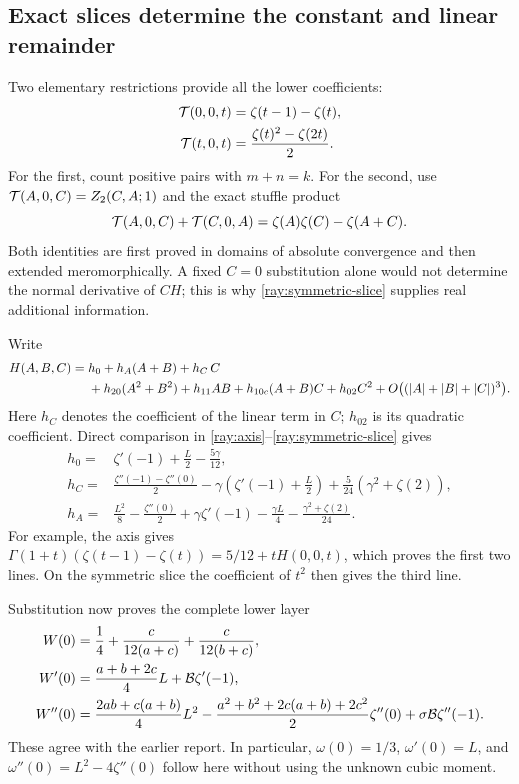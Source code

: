 \subsection{Exact slices determine the constant and linear remainder}

Two elementary restrictions provide all the lower coefficients:
\begin{align}
 \mathcal T(0,0,t)&=\zeta(t-1)-\zeta(t),\label{ray:axis}\\
 \mathcal T(t,0,t)&=\frac{\zeta(t)^2-\zeta(2t)}2.\label{ray:symmetric-slice}
\end{align}
For the first, count positive pairs with $m+n=k$. For the second,
use $\mathcal T(A,0,C)=Z_2(C,A;1)$ and the exact stuffle product
\begin{equation}\label{ray:stuffle-slice}
 \mathcal T(A,0,C)+\mathcal T(C,0,A)=\zeta(A)\zeta(C)-\zeta(A+C).
\end{equation}
Both identities are first proved in domains of absolute convergence
and then extended meromorphically. A fixed $C=0$ substitution alone
would not determine the normal derivative of $CH$; this is why
\eqref{ray:symmetric-slice} supplies real additional information.

Write
\begin{align}
 H(A,B,C)={}&h_0+h_A(A+B)+h_C\,C\notag\\
 &+h_{20}(A^2+B^2)+h_{11}AB+h_{10c}(A+B)C+h_{02}C^2
 +O\bigl((|A|+|B|+|C|)^3\bigr).
 \label{ray:H-Taylor}
\end{align}
Here $h_C$ denotes the coefficient of the linear term in $C$;
$h_{02}$ is its quadratic coefficient. Direct comparison in
\eqref{ray:axis}--\eqref{ray:symmetric-slice} gives
\begin{align}
 h_0={}&\zeta'(-1)+\frac L2-\frac{5\gamma}{12},\label{ray:h0}\\
 h_C={}&\frac{\zeta''(-1)-\zeta''(0)}2
       -\gamma\left(\zeta'(-1)+\frac L2\right)
       +\frac5{24}(\gamma^2+\zeta(2)),\label{ray:hC}\\
 h_A={}&\frac{L^2}{8}-\frac{\zeta''(0)}2+
       \gamma\zeta'(-1)-\frac{\gamma L}{4}
       -\frac{\gamma^2+\zeta(2)}{24}.
 \label{ray:hA}
\end{align}
For example, the axis gives
$\Gamma(1+t)(\zeta(t-1)-\zeta(t))=5/12+tH(0,0,t)$,
which proves the first two lines. On the symmetric slice the
coefficient of $t^2$ then gives the third line.

Substitution now proves the complete lower layer
\begin{align}
 W(0)&=\frac14+\frac{c}{12(a+c)}+\frac{c}{12(b+c)},\notag\\
 W'(0)&=\frac{a+b+2c}{4}L+\mathcal B\zeta'(-1),\notag\\
 W''(0)&=\frac{2ab+c(a+b)}4L^2
 -\frac{a^2+b^2+2c(a+b)+2c^2}{2}\zeta''(0)
 +\sigma\mathcal B\zeta''(-1).
 \label{ray:lower}
\end{align}
These agree with the earlier report. In particular,
 $\omega(0)=1/3$, $\omega'(0)=L$, and
$\omega''(0)=L^2-4\zeta''(0)$ follow here without using the
unknown cubic moment.

